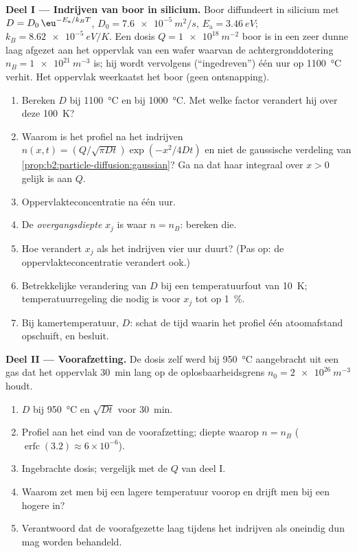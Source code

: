 \begin{problem}\label{pb:b2:particle-diffusion:1}
\textbf{Deel I --- Indrijven van boor in silicium.}
Boor diffundeert in silicium met $D = D_0\,\eu^{-E_{\text{a}}/k_BT}$,
$D_0 =
\qty{7.6e-5}{m^2/s}$, $E_{\text{a}} = \qty{3.46}{eV}$;
$k_B =
\qty{8.62e-5}{eV/K}$. Een dosis $Q = \qty{1e18}{m^{-2}}$ boor is
in een zeer dunne laag afgezet aan het oppervlak van een wafer waarvan de
achtergronddotering $n_B = \qty{1e21}{m^{-3}}$ is; hij wordt vervolgens
(``ingedreven'') één uur op \qty{1100}{\celsius} verhit. Het oppervlak
weerkaatst het boor (geen ontsnapping).
\begin{enumerate}
  \item Bereken $D$ bij \qty{1100}{\celsius} en bij \qty{1000}{\celsius}.
        Met welke factor verandert hij over deze \qty{100}{K}?
  \item Waarom is het profiel na het indrijven
        $n(x,t) = (Q/\sqrt{\pi
        Dt})\exp(-x^2/4Dt)$ en niet de
        gaussische verdeling van
        \cref{prop:b2:particle-diffusion:gaussian}? Ga na dat haar
        integraal over $x > 0$ gelijk is aan $Q$.
  \item Oppervlakteconcentratie na één uur.
  \item De \emph{overgangsdiepte} $x_j$ is waar $n = n_B$: bereken die.
  \item Hoe verandert $x_j$ als het indrijven vier uur duurt?
        (Pas op: de oppervlakteconcentratie verandert ook.)
  \item Betrekkelijke verandering van $D$ bij een temperatuurfout van \qty{10}{K};
        temperatuurregeling die nodig is voor $x_j$ tot op \qty{1}{\%}.
  \item Bij kamertemperatuur, $D$: schat de tijd waarin het profiel
        één atoomafstand opschuift, en besluit.
\end{enumerate}

\textbf{Deel II --- Voorafzetting.}
De dosis zelf werd bij \qty{950}{\celsius} aangebracht uit een gas dat
het oppervlak \qty{30}{min} lang op de oplosbaarheidsgrens
$n_0 = \qty{2e26}{m^{-3}}$
houdt.
\begin{enumerate}[resume]
  \item $D$ bij \qty{950}{\celsius} en $\sqrt{Dt}$ voor \qty{30}{min}.
  \item Profiel aan het eind van de voorafzetting; diepte waarop
        $n =
        n_B$
        ($\operatorname{erfc}(3.2) \approx 6 \times 10^{-6}$).
  \item Ingebrachte dosis; vergelijk met de $Q$ van deel I.
  \item Waarom zet men bij een lagere temperatuur voorop en drijft men bij
        een hogere in?
  \item Verantwoord dat de voorafgezette laag tijdens het indrijven als
        oneindig dun mag worden behandeld.
\end{enumerate}


\end{problem}
